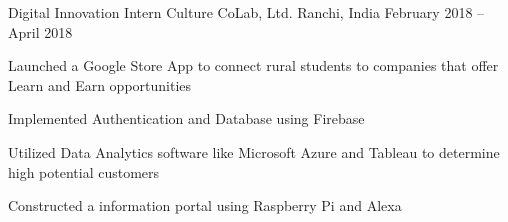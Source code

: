 \begin{cventries}
	\vspace{-2mm}
	\cventry
	{Digital Innovation Intern}
	{Culture CoLab, Ltd.}
	{Ranchi, India}
	{February 2018 – April 2018}
	{\begin{cvitems}
		\item {Launched a Google Store App to connect rural students to companies that offer Learn and Earn opportunities}
		\item {Implemented Authentication and Database using Firebase}
		\item {Utilized Data Analytics software like Microsoft Azure and Tableau to determine high potential customers}
		\item {Constructed a information portal using Raspberry Pi and Alexa}
		\end{cvitems}}

\end{cventries}
